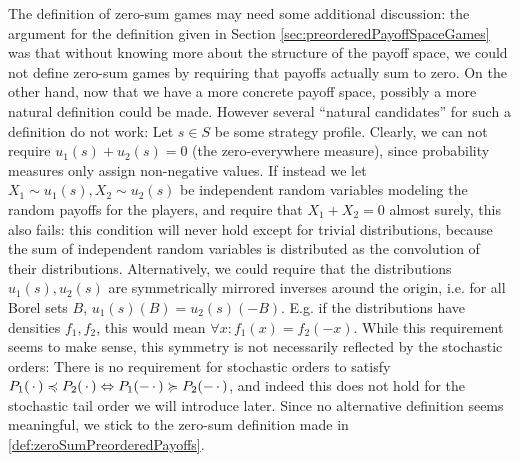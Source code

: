 \documentclass[a4paper]{scrreprt}
\begin{document}
    The definition of zero-sum games may need some additional discussion: the argument for the definition given in Section \ref{sec:preorderedPayoffSpaceGames} was that without knowing more about the structure of the payoff space, we could not define zero-sum games by requiring that payoffs actually sum to zero.
    On the other hand, now that we have a more concrete payoff space, possibly a more natural definition could be made.    
    However several “natural candidates” for such a definition do not work: Let $s \in S$ be some strategy profile.
    Clearly, we can not require $u_1(s) + u_2(s) = 0$ (the zero-everywhere measure), since probability measures only assign non-negative values.
    If instead we let $X_1 \sim u_1(s), X_2 \sim u_2(s)$ be independent random variables modeling the random payoffs for the players, and require that $X_1 + X_2 = 0$ almost surely, this also fails: this condition will never hold except for trivial distributions, because the sum of independent random variables is distributed as the convolution of their distributions.
    Alternatively, we could require that the distributions $u_1(s), u_2(s)$ are symmetrically mirrored inverses around the origin, i.e. for all Borel sets $B$, $u_1(s)(B) = u_2(s)(-B)$. E.g. 
    if the distributions have densities $f_1, f_2$, this would mean $\forall x: f_1(x) = f_2(-x)$.
    While this requirement seems to make sense, this symmetry is not necessarily reflected by the stochastic orders: There is no requirement for stochastic orders to satisfy $P_1(\,\cdot\,) \preccurlyeq P_2(\,\cdot\,) \Leftrightarrow P_1(-\,\cdot\,) \succcurlyeq P_2(-\,\cdot\,)$, and indeed this does not hold for the stochastic tail order we will introduce later.
    Since no alternative definition seems meaningful, we stick to the zero-sum definition made in \ref{def:zeroSumPreorderedPayoffs}.
\end{document}
